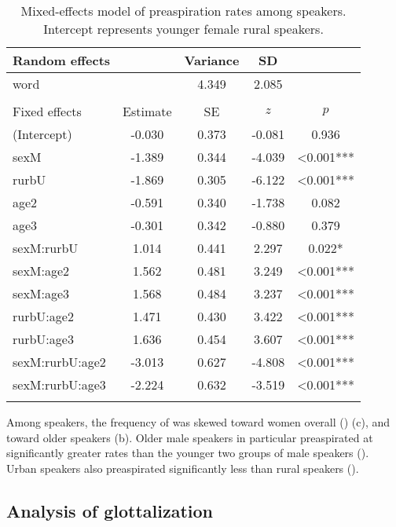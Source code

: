 \documentclass[output=paper,colorlinks,citecolor=brown]{langscibook}
\begin{document}
\begin{table}
\begin{tabular}{l S[table-format=-1.3] S[table-format=1.3] S[table-format=-1.3] S[table-format=<1.3{***}]}
\lsptoprule
{Random effects} &  & {Variance} & {SD} & \\
\midrule
{word} &  & 4.349 & 2.085 & \\
\\
{Fixed effects} & {Estimate} & {SE} & {$z$} & {$p$}\\
\midrule
(Intercept) & -0.030 & 0.373 &  -0.081 & 0.936\\
sexM & -1.389 & 0.344 & -4.039 & <0.001{***} \\
rurbU & -1.869 & 0.305 & -6.122 & <0.001{***} \\
age2 & -0.591 & 0.340 & -1.738 & 0.082\\
age3 & -0.301 & 0.342 & -0.880 & 0.379\\
sexM:rurbU & 1.014 & 0.441 & 2.297 & 0.022{*} \\
sexM:age2 & 1.562 & 0.481 & 3.249 & <0.001{***} \\
sexM:age3 & 1.568 & 0.484 & 3.237 & <0.001{***} \\
rurbU:age2 & 1.471 & 0.430 & 3.422 & <0.001{***} \\
rurbU:age3 & 1.636 & 0.454 & 3.607 & <0.001{***} \\
sexM:rurbU:age2 & -3.013 & 0.627 & -4.808 & <0.001{***} \\
sexM:rurbU:age3 & -2.224 & 0.632 & -3.519 & <0.001{***} \\
\lspbottomrule
\end{tabular}
\caption{Mixed-effects model of preaspiration rates among  speakers. Intercept represents younger female rural speakers.}
\label{tab:clayton:5}
\end{table}

Among  speakers, the frequency of  was skewed toward women overall () (c), and toward older speakers (b). Older male speakers in particular preaspirated at significantly greater rates than the younger two groups of male speakers (). Urban speakers also preaspirated significantly less than rural speakers ().

\subsection{Analysis of glottalization}
\end{document}
